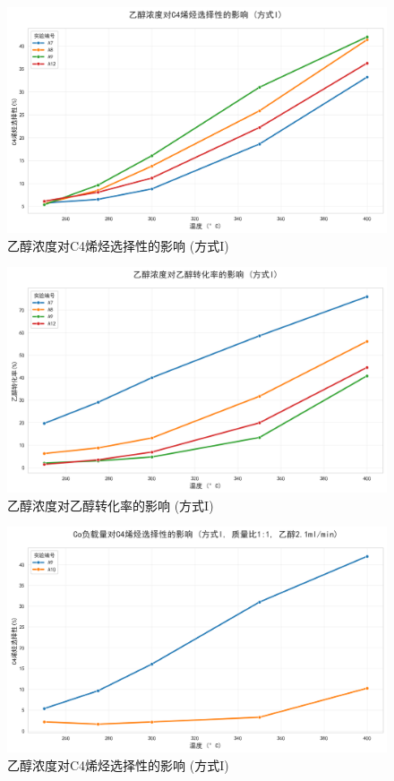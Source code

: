\begin{figure}[h]%
	\centering%
	\includegraphics [scale=0.6]{图/2-2-3-1.png}
	\caption{乙醇浓度对C4烯烃选择性的影响 (方式I)} 
	\label{fig:1}
\end{figure}

\begin{figure}[h]%
	\centering%
	\includegraphics [scale=0.6]{图/2-2-3-2.png}
	\caption{乙醇浓度对乙醇转化率的影响 (方式I)} 
	\label{fig:1}
\end{figure}

\begin{figure}[h]%
	\centering%
	\includegraphics [scale=0.6]{图/2-3-2-1.png}
	\caption{乙醇浓度对C4烯烃选择性的影响 (方式I)} 
	\label{fig:1}
\end{figure}

